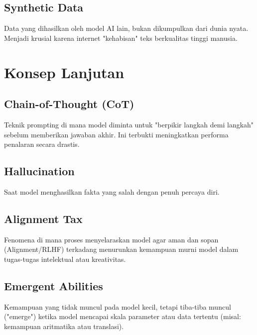 \subsection{Synthetic Data}
Data yang dihasilkan oleh model AI lain, bukan dikumpulkan dari dunia nyata. Menjadi krusial karena internet "kehabisan" teks berkualitas tinggi manusia.

\section{Konsep Lanjutan}

\subsection{Chain-of-Thought (CoT)}
Teknik prompting di mana model diminta untuk "berpikir langkah demi langkah" sebelum memberikan jawaban akhir. Ini terbukti meningkatkan performa penalaran secara drastis.

\subsection{Hallucination}
Saat model menghasilkan fakta yang salah dengan penuh percaya diri.

\subsection{Alignment Tax}
Fenomena di mana proses menyelaraskan model agar aman dan sopan (Alignment/RLHF) terkadang menurunkan kemampuan murni model dalam tugas-tugas intelektual atau kreativitas.

\subsection{Emergent Abilities}
Kemampuan yang tidak muncul pada model kecil, tetapi tiba-tiba muncul ("emerge") ketika model mencapai skala parameter atau data tertentu (misal: kemampuan aritmatika atau translasi).
